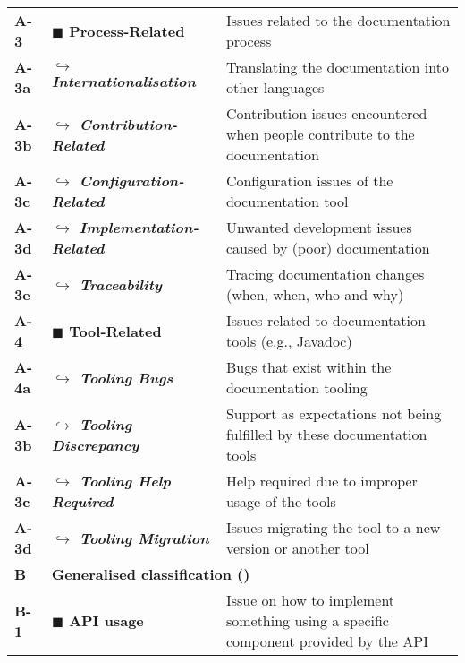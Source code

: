 \begin{table*}[tb]
{\begin{tabular}{l|p{.25\linewidth}p{.75\linewidth}}
    \textbf{A-3} &
    \textbf{$\blacksquare$ Process-Related\dotfill} &
    Issues related to the documentation process \\
    \textbf{A-3a} &
    \textbf{$\hookrightarrow$ \textit{Internationalisation}\dotfill} &
    Translating the documentation into other languages \\
    \textbf{A-3b} &
    \textbf{$\hookrightarrow$ \textit{Contribution-Related}\dotfill} &
    Contribution issues encountered when people contribute to the documentation \\
    \textbf{A-3c} &
    \textbf{$\hookrightarrow$ \textit{Configuration-Related}\dotfill} &
    Configuration issues of the documentation tool \\
    \textbf{A-3d} &
    \textbf{$\hookrightarrow$ \textit{Implementation-Related}\dotfill} &
    Unwanted development issues caused by (poor) documentation \\
    \textbf{A-3e} &
    \textbf{$\hookrightarrow$ \textit{Traceability}\dotfill} &
    Tracing documentation changes (when, when, who and why)\\


    \textbf{A-4} &
    \textbf{$\blacksquare$ Tool-Related\dotfill} &
    Issues related to documentation tools (e.g., Javadoc) \\
    \textbf{A-4a} &
    \textbf{$\hookrightarrow$ \textit{Tooling Bugs}\dotfill} &
    Bugs that exist within the documentation tooling \\
    \textbf{A-3b} &
    \textbf{$\hookrightarrow$ \textit{Tooling Discrepancy}\dotfill} &
    Support as expectations not being fulfilled by these documentation tools\\
    \textbf{A-3c} &
    \textbf{$\hookrightarrow$ \textit{Tooling Help Required}\dotfill} &
    Help required due to improper usage of the tools \\
    \textbf{A-3d} &
    \textbf{$\hookrightarrow$ \textit{Tooling Migration}\dotfill} &
    Issues migrating the tool to a new version or another tool \\

    \midrule
    \midrule

    \textbf{B} &
    \multicolumn{2}{l}{
      \textbf{Generalised classification (\citet{Beyer:2018fm})}
    }

    \\
    \midrule

    \textbf{B-1} &
    \textbf{$\blacksquare$ API usage\dotfill} &
    Issue on how to implement something using a specific component provided by the API
    \\


\end{tabular}}
\end{table*}
